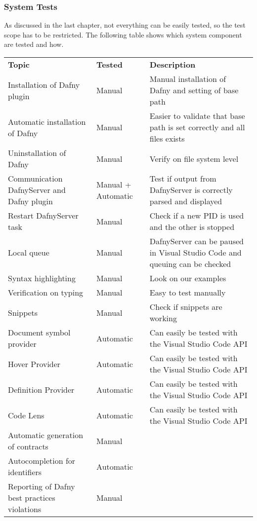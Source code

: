 \subsubsection{System Tests}
As discussed in the last chapter, not everything can be easily tested, so the test scope has to be restricted. The following table shows which system component are tested and how.
\begin{longtable}{ p{} | p{} | p{} }
\textbf{Topic} & \textbf{Tested} & \textbf{Description}\\
	Installation of Dafny plugin & Manual & Manual installation of Dafny and setting of base path   \\
	Automatic installation of Dafny & Manual & Easier to validate that base path is set correctly and all files exists \\
	Uninstallation of Dafny & Manual & Verify on file system level\\
	Communication DafnyServer and Dafny plugin & Manual + Automatic & Test if output from DafnyServer is correctly parsed and displayed\\
	Restart DafnyServer task & Manual & Check if a new PID is used and the other is stopped\\
	Local queue & Manual & DafnyServer can be paused in Visual Studio Code and queuing can be checked \\
	Syntax highlighting & Manual & Look on our examples \\
	Verification on typing & Manual & Easy to test manually\\
	Snippets & Manual & Check if snippets are working\\
	Document symbol provider & Automatic & Can easily be tested with the Visual Studio Code API \\
	Hover Provider & Automatic & Can easily be tested with the Visual Studio Code API\\
	Definition Provider & Automatic & Can easily be tested with the Visual Studio Code API  \\
	Code Lens & Automatic & Can easily be tested with the Visual Studio Code API\\
	Automatic generation of contracts & Manual & \todo{add desc} \\
	Autocompletion for identifiers & Automatic & \todo{add desc} \\
	Reporting of Dafny best practices violations & Manual & \todo{add desc} \\
\end{longtable}


